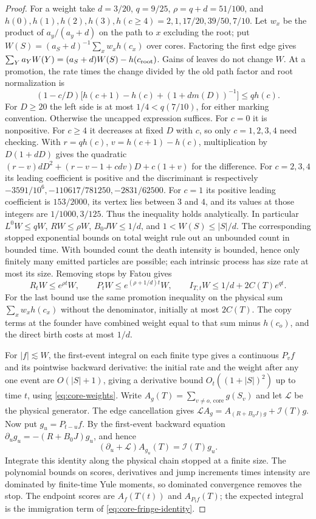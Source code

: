 \documentclass[11pt]{article}
\theoremstyle{remark}
\numberwithin{equation}{section}
\begin{document}
\begin{proof}
For a weight take $d=3/20$, $q=9/25$, $\rho=q+d=51/100$, and $h(0),h(1),h(2),h(3),h(c\ge4)=2,1,17/20,39/50,7/10$. Let $w_x$ be the product of $a_y/(a_y+d)$ on the path to $x$ excluding the root; put $W(S)=(a_S+d)^{-1}\sum_x w_xh(c_x)$ over cores. Factoring the first edge gives $\sum_Y a_YW(Y)=(a_S+d)W(S)-h(c_{\rm root})$. Gains of leaves do not change $W$. At a promotion, the rate times the change divided by the old path factor and root normalization is
\[
 (1-c/D)\big[h(c+1)-h(c)+(1+d m(D))^{-1}\big]\le qh(c).
\]
For $D\ge20$ the left side is at most $1/4<q(7/10)$, for either marking convention. Otherwise the uncapped expression suffices. For $c=0$ it is nonpositive. For $c\ge4$ it decreases at fixed $D$ with $c$, so only $c=1,2,3,4$ need checking. With $r=qh(c)$, $v=h(c+1)-h(c)$, multiplication by $D(1+dD)$ gives the quadratic $(r-v)dD^2+(r-v-1+cdv)D+c(1+v)$ for the difference. For $c=2,3,4$ its leading coefficient is positive and the discriminant is respectively $-3591/10^6,-110617/781250,-2831/62500$. For $c=1$ its positive leading coefficient is $153/2000$, its vertex lies between $3$ and $4$, and its values at those integers are $1/1000,3/125$. Thus the inequality holds analytically. In particular $L^0W\le qW$, $RW\le\rho W$, $B_0JW\le1/d$, and $1<W(S)\le |S|/d$. The corresponding stopped exponential bounds on total weight rule out an unbounded count in bounded time. With bounded count the death intensity is bounded, hence only finitely many emitted particles are possible; each intrinsic process has size rate at most its size. Removing stops by Fatou gives
\begin{equation}\label{eq:core-weights}
 R_tW\le e^{\rho t}W,\qquad P_tW\le e^{(\rho+1/d)t}W,
 \qquad I_{T,t}W\le 1/d+2C(T)e^{qt}.
\end{equation}
For the last bound use the same promotion inequality on the physical sum $\sum_x w_xh(c_x)$ without the denominator, initially at most $2C(T)$. The copy terms at the founder have combined weight equal to that sum minus $h(c_o)$, and the direct birth costs at most $1/d$.

For $|f|\lesssim W$, the first-event integral on each finite type gives a continuous $P_v f$ and its pointwise backward derivative: the initial rate and the weight after any one event are $O(|S|+1)$, giving a derivative bound $O_t((1+|S|)^2)$ up to time $t$, using \eqref{eq:core-weights}. Write $A_g(T)=\sum_{v\ne o,\,\mathrm{core}}g(S_v)$ and let $\mathcal L$ be the physical generator. The edge cancellation gives $\mathcal L A_g=A_{(R+B_0J)g}+\mathcal I(T)g$. Now put $g_u=P_{t-u}f$. By the first-event backward equation $\partial_u g_u=-(R+B_0J)g_u$, and hence
\[
 (\partial_u+\mathcal L)A_{g_u}(T)=\mathcal I(T)g_u.
\]
Integrate this identity along the physical chain stopped at a finite size. The polynomial bounds on scores, derivatives and jump increments times intensity are dominated by finite-time Yule moments, so dominated convergence removes the stop. The endpoint scores are $A_f(T(t))$ and $A_{P_tf}(T)$; the expected integral is the immigration term of \eqref{eq:core-fringe-identity}.


\end{proof}
\end{document}
